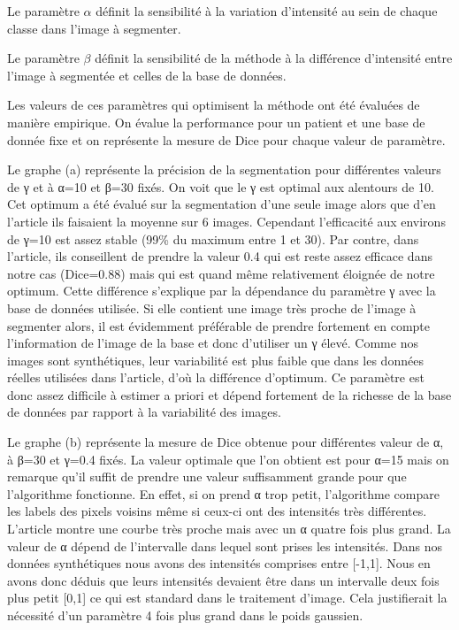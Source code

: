 \documentclass{article}
\begin{document}
Le paramètre $\alpha$ définit la sensibilité à la variation d’intensité au sein de chaque classe dans l’image à segmenter. 

Le paramètre $\beta$ définit la sensibilité de la méthode à la différence d’intensité entre l’image à segmentée et celles de la base de données. 

Les valeurs de ces paramètres qui optimisent la méthode ont été évaluées de manière empirique. On évalue la performance pour un patient et une base de donnée fixe et on représente la mesure de Dice pour chaque valeur de paramètre.


Le graphe (a) représente la précision de la segmentation pour différentes valeurs de γ et à α=10 et β=30 fixés. On voit que le γ est optimal aux alentours de 10. Cet optimum a été évalué sur la segmentation d’une seule image alors que d’en l’article ils faisaient la moyenne sur 6 images. Cependant l’efficacité aux environs de γ=10 est assez stable (99\% du maximum entre 1 et 30). Par contre, dans l’article, ils conseillent de prendre la valeur 0.4 qui est reste assez efficace dans notre cas (Dice=0.88) mais qui est quand même relativement éloignée de notre optimum. Cette différence s’explique par la dépendance du paramètre γ  avec la base de données utilisée. Si elle contient une image très proche de l’image à segmenter alors, il est évidemment préférable de prendre fortement en compte l’information de l’image de la base et donc d’utiliser un γ élevé. Comme nos images sont synthétiques, leur variabilité est plus faible que dans les données réelles utilisées dans l’article, d’où la différence d’optimum. Ce paramètre est donc assez difficile à estimer a priori et dépend fortement de la richesse de la base de données par rapport à la variabilité des images.

 Le graphe (b) représente la mesure de Dice obtenue pour différentes valeur de α, à β=30 et γ=0.4 fixés. La valeur optimale que l’on obtient est pour α=15 mais on remarque qu’il suffit de prendre une valeur suffisamment grande pour que l’algorithme fonctionne. En effet, si on prend α trop petit, l’algorithme compare les labels des pixels voisins même si ceux-ci ont des intensités très différentes. L’article montre une courbe très proche mais avec un α quatre fois plus grand. La valeur de α dépend de l’intervalle dans lequel sont prises les intensités. Dans nos données synthétiques nous avons des intensités comprises entre [-1,1]. Nous en avons donc déduis que leurs intensités devaient être dans un intervalle deux fois plus petit [0,1] ce qui est standard dans le traitement d’image. Cela justifierait la nécessité d’un paramètre 4 fois plus grand dans le poids gaussien.
\end{document}
